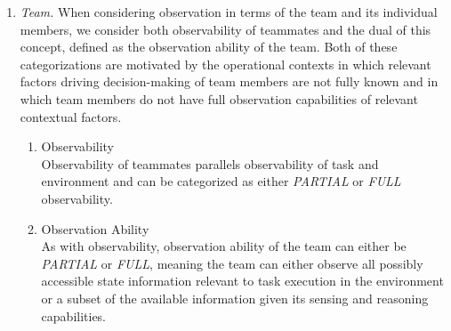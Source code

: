 \documentclass[letterpaper, 10 pt, conference]{ieeeconf}  %
\theoremstyle{definition}
\begin{document}
\begin{enumerate}
{\begin{enumerate}
    \item \textit{Team.}
    When considering observation in terms of the team and its individual members, we consider both observability of teammates and the dual of this concept, defined as the observation ability of the team. Both of these categorizations are motivated by the operational contexts in which relevant factors driving decision-making of team members are not fully known and in which team members do not have full observation capabilities of relevant contextual factors.
    \begin{enumerate}
        \item Observability\\
            Observability of teammates parallels observability of task and environment and can be categorized as either \textit{PARTIAL} or \textit{FULL} observability. 
        \item Observation Ability\\
            As with observability, observation ability of the team can either be \textit{PARTIAL} or \textit{FULL}, meaning the team can either observe all possibly accessible state information relevant to task execution in the environment or a subset of the available information given its sensing and reasoning capabilities.
    \end{enumerate}
    
    
\end{enumerate}
}


\end{enumerate}
\end{document}
